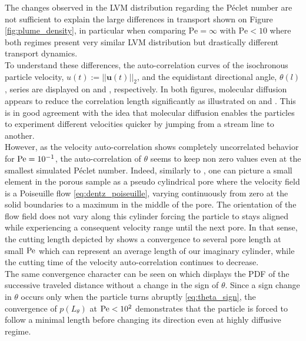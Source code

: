 The changes observed in the LVM distribution regarding the Péclet number are not sufficient to explain the large differences in transport shown on Figure \ref{fig:plume_density}, in particular when comparing $\mathrm{Pe}=\infty$ with $\mathrm{Pe}<10$ where both regimes present very similar LVM distribution but drastically different transport dynamics.\\
To understand these differences, the auto-correlation curves of the isochronous particle velocity, $u(t):=||\textbf{u}(t)||_2$, and the equidistant directional angle, $\theta(l)$, series are displayed on  and , respectively.
In both figures, molecular diffusion appears to reduce the correlation length significantly as illustrated on  and . 
This is in good agreement with the idea that molecular diffusion enables the particles to experiment different velocities quicker by jumping from a stream line to another.\\
However, as the velocity auto-correlation shows completely uncorrelated behavior for $\mathrm{Pe}=10^{-1}$, the auto-correlation of $\theta$ seems to keep non zero values even at the smallest simulated Péclet number.
Indeed, similarly to \citet{Dentz2017}, one can picture a small element in the porous sample as a pseudo cylindrical pore where the velocity field is a Poiseuille flow \eqref{eq:dentz_poiseuille}, varying continuously from zero at the solid boundaries to a maximum in the middle of the pore.
The orientation of the flow field does not vary along this cylinder forcing the particle to stays aligned while experiencing a consequent velocity range until the next pore.
In that sense, the cutting length depicted by  shows a convergence to several pore length at small $\mathrm{Pe}$ which can represent an average length of our imaginary cylinder, while the cutting time of the velocity auto-correlation continues to decrease.\\
The same convergence character can be seen on  which displays the PDF of the successive traveled distance without a change in the sign of $\theta$.
Since a sign change in $\theta$ occurs only when the particle turns abruptly \eqref{eq:theta_sign}, the convergence of $p(L_\theta)$ at $\mathrm{Pe}<10^2$ demonstrates that the particle is forced to follow a minimal length before changing its direction even at highly diffusive regime.
